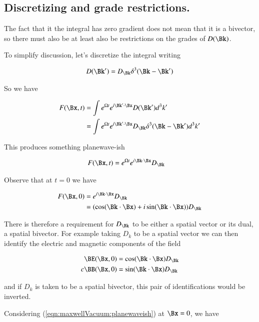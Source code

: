 \subsection{Discretizing and grade restrictions.}

The fact that it the integral has zero gradient does not mean that it is a bivector, so there must also be at least also be restrictions on the grades of $D(\Bk)$.

To simplify discussion, let's discretize the integral writing

\begin{align*}
D(\Bk') = D_\Bk \delta^3 (\Bk - \Bk')
\end{align*}

So we have

\begin{align*}
F(\Bx,t)
&= \int e^{\Omega t} e^{i \Bk' \cdot \Bx} D(\Bk') d^3 k' \\
&= \int e^{\Omega t} e^{i \Bk' \cdot \Bx} D_\Bk \delta^3(\Bk - \Bk') d^3 k' \\
\end{align*}

This produces something planewave-ish

\begin{align}\label{eqn:maxwellVacuum:planewaveish}
F(\Bx,t) &= e^{\Omega t} e^{i \Bk \cdot \Bx} D_\Bk
\end{align}

Observe that at $t=0$ we have

\begin{align*}
F(\Bx,0)
&= e^{i \Bk \cdot \Bx} D_\Bk  \\
&= (\cos (\Bk \cdot \Bx) + i \sin(\Bk \cdot \Bx)) D_\Bk  \\
\end{align*}

There is therefore a requirement for $D_\Bk$ to be either a spatial vector or its dual, a spatial bivector.  For example taking $D_k$ to be a spatial vector we can then identify the electric and magnetic components of the field

\begin{align*}
\BE(\Bx,0) &= \cos (\Bk \cdot \Bx) D_\Bk \\
c \BB(\Bx,0) &= \sin (\Bk \cdot \Bx) D_\Bk
\end{align*}

and if $D_k$ is taken to be a spatial bivector, this pair of identifications would be inverted.

Considering (\ref{eqn:maxwellVacuum:planewaveish}) at $\Bx=0$, we have

